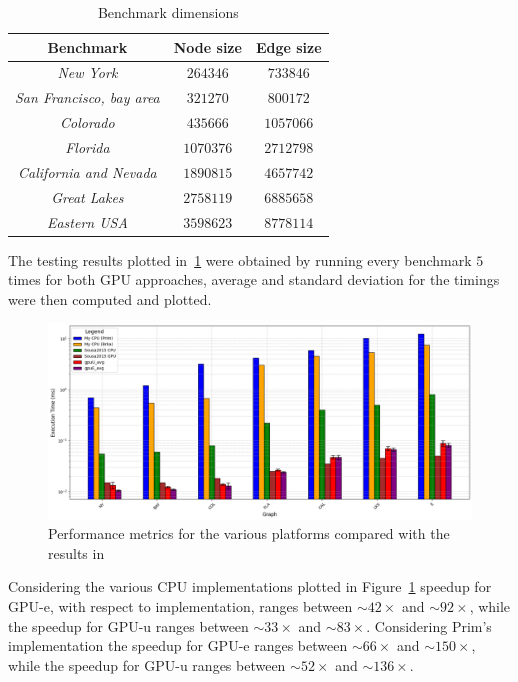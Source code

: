 \documentclass[a4paper,10pt]{article}
\begin{document}
\begin{longtable}{|c|c|c|}
	\caption{Benchmark dimensions}\label{tbl:benchmarks}
	\\\hline\textbf{Benchmark} & \textbf{Node size} & \textbf{Edge size} \\\hline\hline
	\endfirsthead\hline\endlastfoot

	\textit{New York}                & $\num{264346}$   & $\num{733846}$  \\\hline
	\textit{San Francisco, bay area} & $\num{321270}$   & $\num{800172}$  \\\hline
	\textit{Colorado}                & $\num{435666}$   & $\num{1057066}$ \\\hline
	\textit{Florida}                 & $\num{1070376}$  & $\num{2712798}$ \\\hline
	\textit{California and Nevada}   & $\num{1890815}$ & $\num{4657742}$ \\\hline
	\textit{Great Lakes}             & $\num{2758119}$  & $\num{6885658}$ \\\hline
	\textit{Eastern USA}             & $\num{3598623}$  & $\num{8778114}$
\end{longtable}
The testing results plotted in~\ref{fig:results} were obtained by running every benchmark $5$ times for both GPU approaches, average and standard deviation for the timings were then computed and plotted.
\begin{figure}
	\centering
	\includegraphics[scale=0.4]{fig/benchmarks.png}
	\caption{Performance metrics for the various platforms compared with the results in \cite{generic-he-boruvka}}
	\label{fig:results}
\end{figure}
Considering the various CPU implementations plotted in Figure~\ref{fig:results} speedup for GPU-e, with respect to \brka implementation, ranges between $\sim42\times$ and $\sim92\times$, while the speedup for GPU-u ranges between $\sim33\times$ and $\sim83\times$. Considering Prim's implementation the speedup for GPU-e ranges between $\sim66\times$ and $\sim150\times$, while the speedup for GPU-u ranges between $\sim52\times$ and $\sim136\times$.
\end{document}
